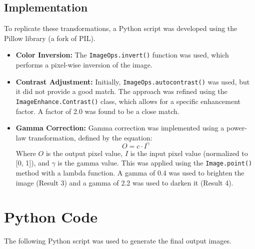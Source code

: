 \documentclass{article}
\begin{document}
\subsection{Implementation}
To replicate these transformations, a Python script was developed using the Pillow library (a fork of PIL).

\begin{itemize}
    \item \textbf{Color Inversion:} The \texttt{ImageOps.invert()} function was used, which performs a pixel-wise inversion of the image.
    \item \textbf{Contrast Adjustment:} Initially, \texttt{ImageOps.autocontrast()} was used, but it did not provide a good match. The approach was refined using the \texttt{ImageEnhance.Contrast()} class, which allows for a specific enhancement factor. A factor of 2.0 was found to be a close match.
    \item \textbf{Gamma Correction:} Gamma correction was implemented using a power-law transformation, defined by the equation:
    \[ O = c \cdot I^{\gamma} \]
    Where \(O\) is the output pixel value, \(I\) is the input pixel value (normalized to [0, 1]), and \(\gamma\) is the gamma value. This was applied using the \texttt{Image.point()} method with a lambda function. A gamma of 0.4 was used to brighten the image (Result 3) and a gamma of 2.2 was used to darken it (Result 4).
\end{itemize}

\section{Python Code}
The following Python script was used to generate the final output images.
\end{document}
